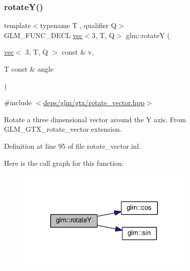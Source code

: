 \subsubsection{\texorpdfstring{rotate\+Y()}{rotateY()}\hspace{0.1cm}{\footnotesize\ttfamily [1/2]}}
{\footnotesize\ttfamily template$<$typename T , qualifier Q$>$ \\
G\+L\+M\+\_\+\+F\+U\+N\+C\+\_\+\+D\+E\+CL \hyperlink{structglm_1_1vec}{vec}$<$3, T, Q$>$ glm\+::rotateY (\begin{DoxyParamCaption}\item[{\hyperlink{structglm_1_1vec}{vec}$<$ 3, T, Q $>$ const \&}]{v,  }\item[{T const \&}]{angle }\end{DoxyParamCaption})}



{\ttfamily \#include $<$\hyperlink{rotate__vector_8hpp}{deps/glm/gtx/rotate\+\_\+vector.\+hpp}$>$}

Rotate a three dimensional vector around the Y axis. From G\+L\+M\+\_\+\+G\+T\+X\+\_\+rotate\+\_\+vector extension. 

Definition at line 95 of file rotate\+\_\+vector.\+inl.

Here is the call graph for this function\+:
\nopagebreak
\begin{figure}[H]
\begin{center}
\leavevmode
\includegraphics[width=240pt]{df/d02/group__gtx__rotate__vector_gaebdc8b054ace27d9f62e054531c6f44d_cgraph}
\end{center}
\end{figure}
\mbox{\label{group__gtx__rotate__vector_ga3ce3db0867b7f8efd878ee34f95a623b}} 
